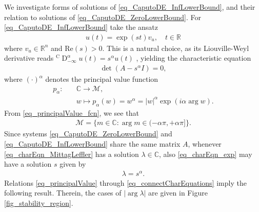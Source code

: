 \documentclass{svproc}
\newcommand{\realnumbers}{\mathbb{R}}
\newcommand{\CderivativeInput}[2]{{}^\mathrm{C}\operatorname{D}_{#2}^{#1}}
\begin{document}
We investigate forms of solutions of \eqref{eq_CaputoDE_InfLowerBound}, and their relation to solutions of  \eqref{eq_CaputoDE_ZeroLowerBound}. For \eqref{eq_CaputoDE_InfLowerBound} take the ansatz
\begin{align}\label{eq_ansatzExp}
	u(t) = \exp(s t) v_u,\quad t \in \realnumbers
\end{align}
where $v_u\in \realnumbers^n$ and $\mathrm{Re}(s) >0$. This is a natural choice, as its Liouville-Weyl derivative reads $\CderivativeInput{\alpha}{-\infty}u(t) = s^\alpha u(t)$ \cite{samko1993fractional}, yielding the characteristic equation
\begin{align} \label{eq_charEqn_exp}
	\det (A -s^\alpha I) = 0,
\end{align}
where $(\cdot)^\alpha$ denotes the principal value function
\begin{subequations}\label{eq_principalValue}
	\begin{align}
		p_\alpha:\quad &\mathbb C \to \mathcal M,\\
		& w \mapsto p_\alpha(w) = w^\alpha = |w|^\alpha \exp (i \alpha \arg w). \label{eq_principalValue_fcn}
	\end{align}
\end{subequations}
From \eqref{eq_principalValue_fcn}, we see that
\begin{align}
	\mathcal M = \{ m\in \mathbb C : \arg m \in (-\alpha \pi,+\alpha \pi]\}.
\end{align} Since systems \eqref{eq_CaputoDE_ZeroLowerBound} and \eqref{eq_CaputoDE_InfLowerBound} share the same matrix $A$, whenever \eqref{eq_charEqn_MittagLeffler} has a solution $\lambda \in \mathbb C$, also \eqref{eq_charEqn_exp} may have a solution $s$ given by
\begin{align}\label{eq_connectCharEquations}
	\lambda = s^\alpha.
\end{align}
	Relations \eqref{eq_principalValue} through \eqref{eq_connectCharEquations} imply the following result. Therein, the cases of $|\arg \lambda|$ are given in Figure \ref{fig_stability_region}.
\end{document}
